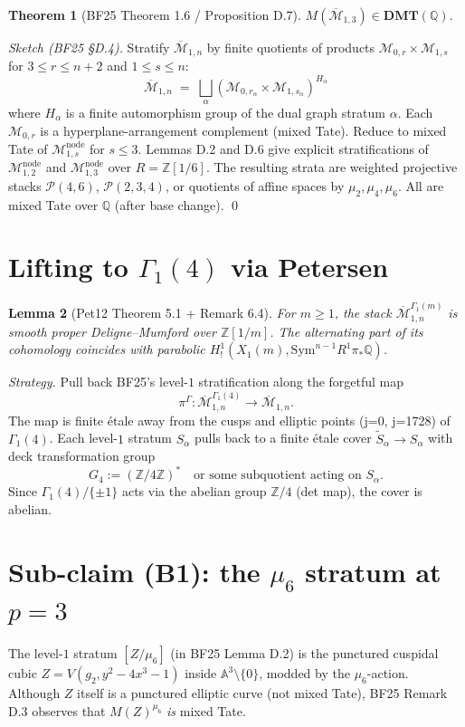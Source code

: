 \documentclass[11pt]{article}
\newtheorem{theorem}{Theorem}
\newtheorem{lemma}[theorem]{Lemma}
\theoremstyle{definition}
\newcommand{\MM}{\overline{\mathcal{M}}}
\newcommand{\Mo}{\mathcal{M}}
\newcommand{\Z}{\mathbb{Z}}
\newcommand{\Q}{\mathbb{Q}}
\newcommand{\Sym}{\mathrm{Sym}}
\newcommand{\DMT}{\mathbf{DMT}}
\newcommand{\GM}{G_4}
\begin{document}
\begin{theorem}[BF25 Theorem 1.6 / Proposition D.7]
$M(\MM_{1,3}) \in \DMT(\Q)$.
\end{theorem}

\noindent\emph{Sketch (BF25 \S D.4).}
Stratify $\MM_{1,n}$ by finite quotients of products $\Mo_{0,r}\times \Mo_{1,s}$
for $3\le r\le n+2$ and $1\le s\le n$:
\[
\MM_{1,n} \;=\; \bigsqcup_\alpha (\Mo_{0,r_\alpha}\times \Mo_{1,s_\alpha})^{H_\alpha}
\]
where $H_\alpha$ is a finite automorphism group of the dual graph stratum $\alpha$.
Each $\Mo_{0,r}$ is a hyperplane-arrangement complement (mixed Tate). Reduce
to mixed Tate of $\Mo_{1,s}^{\mathrm{node}}$ for $s\le 3$. Lemmas D.2 and D.6 give
explicit stratifications of $\Mo_{1,2}^{\mathrm{node}}$ and $\Mo_{1,3}^{\mathrm{node}}$
over $R = \Z[1/6]$. The resulting strata are
weighted projective stacks $\mathcal{P}(4,6)$, $\mathcal{P}(2,3,4)$,
or quotients of affine spaces by $\mu_2, \mu_4, \mu_6$. All are mixed Tate
over $\Q$ (after base change). \qed

\section{Lifting to $\Gamma_1(4)$ via Petersen}

\begin{lemma}[Pet12 Theorem 5.1 + Remark 6.4]
For $m\ge 1$, the stack $\MM_{1,n}^{\Gamma_1(m)}$ is smooth proper Deligne--Mumford
over $\Z[1/m]$. The alternating part of its cohomology coincides with parabolic
$H^1_!(X_1(m), \Sym^{n-1} R^1\pi_*\Q)$.
\end{lemma}

\noindent\emph{Strategy.} Pull back BF25's level-$1$ stratification along the forgetful map
\[
\pi^{\Gamma}\colon \MM_{1,n}^{\Gamma_1(4)} \longrightarrow \MM_{1,n}.
\]
The map is finite étale away from the cusps and elliptic points (j=0, j=1728)
of $\Gamma_1(4)$. Each level-$1$ stratum $S_\alpha$ pulls back to a finite étale cover
$\widetilde{S}_\alpha \to S_\alpha$ with deck transformation group
\[
\GM := (\Z/4\Z)^* \quad\text{or some subquotient acting on $S_\alpha$}.
\]
Since $\Gamma_1(4)/\{\pm 1\}$ acts via the abelian group $\Z/4$ (det map),
the cover is abelian.

\section{Sub-claim (B1): the $\mu_6$ stratum at $p=3$}

The level-$1$ stratum $[Z/\mu_6]$ (in BF25 Lemma D.2) is the punctured cuspidal
cubic $Z = V(g_2, y^2-4x^3-1)$ inside $\mathbb{A}^3 \setminus \{0\}$,
modded by the $\mu_6$-action. Although $Z$ itself is a punctured elliptic curve
(not mixed Tate), BF25 Remark D.3 observes that $M(Z)^{\mu_6}$ \emph{is} mixed Tate.
\end{document}
